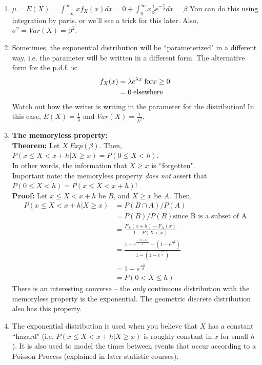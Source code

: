 \documentclass[12pt]{article}
\begin{document}
\begin{enumerate}
    \item $\mu = E(X) = \int_{-\infty}^{\infty} x f_X (x) dx = 0 + \int_0^{\infty} x \frac{1}{\beta} e^{-\frac{x}{\beta}} dx = \beta$
        You can do this using integration by parts, or we'll see a trick for this later. Also, $\sigma^2 = Var(X) = \beta^2$.
    \item Sometimes, the exponential distribution will be ``parameterized" in a different way, i.e. the parameter will be written in a different form. The alternative form for the p.d.f. is:
        \begin{align*}
            f_X (x) &= \lambda e^{\lambda x} \; \textnormal{for} x \geq 0 \\
                &= 0 \; \textnormal{elsewhere}
        \end{align*}
        Watch out how the writer is writing in the parameter for the distribution! In this case, $E(X) = \frac{1}{\lambda}$ and $Var(X) = \frac{1}{\lambda^2}$.
    \item \textbf{The memoryless property:} \\
        \textbf{Theorem:} Let $X ~ Exp(\beta)$. Then, $P(x \leq X < x+h | X \geq x) = P(0 \leq X < h)$. \\
        In other words, the information that $X \geq x$ is ``forgotten". \\
        Important note: the memoryless property \emph{does not} assert that $P(0 \leq X < h) = P(x \leq X < x+h)$! \\
        \textbf{Proof:} Let $x \leq X < x+h$ be $B$, and $X \geq x$ be $A$. Then,
            \begin{align*}
                P(x \leq X < x+h | X \geq x) &= P(B \cap A) / P(A) \\
                    &= P(B)/P(B) \text{since B is a subset of A} \\
                    &= \frac{F_X (x+h) - F_X (x)}{1 - P(X < x)} \\
                    &= \frac{1 - e^{\frac{-(x+h)}{\beta}} - (1 - e^{\frac{-x}{\beta}})}{1 - (1 - e^{\frac{-x}{\beta}})} \\
                    &= 1 - e^{\frac{-h}{\beta}} \\
                    &= P(0 < X \leq h)
            \end{align*}
        There is an interesting converse -- the \emph{only} continuous distribution with the memoryless property is the exponential. The geometric discrete distribution also has this property.
    \item The exponential distribution is used when you believe that $X$ has a constant ``hazard" (i.e. $P(x \leq X < x+h | X \geq x)$ is roughly constant in $x$ for small $h$). It is also used to model the times between events that occur according to a Poisson Process (explained in later statistic courses).

\end{enumerate}
\end{document}
